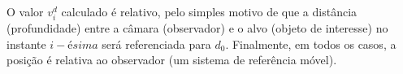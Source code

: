 O valor $v^d_i$ calculado é relativo, pelo simples motivo de que a distância (profundidade) entre a câmara 
(observador) e o alvo (objeto de interesse) no instante $i-ésima$ será referenciada para $d_0$. 
Finalmente, em todos os casos, a posição é 
relativa ao observador (um sistema de referência móvel).

